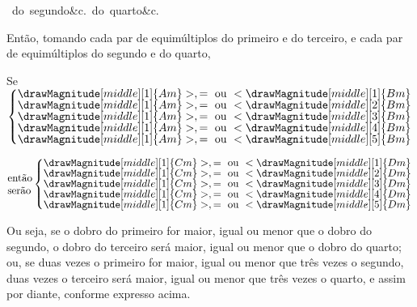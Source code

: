 \documentclass[booklanguage=brazilian]{byrnebook}
\begin{document}
\sepSpace

\vbox{\hfill\hbox{
\vbox{\hbox{do segundo}\hbox{}\hbox{\&c.}}
\vbox{\hbox{do quarto}\hbox{}\hbox{\&c.}}
}\hfill\ }

\sepSpace

Então, tomando cada par de equimúltiplos do primeiro e do terceiro, e cada par de equimúltiplos do segundo e do quarto,

\begin{center}
Se
$\left\{\vcenter{
\nointerlineskip\hbox{$\drawMagnitude[middle][1]{Am} >, = \mbox{ ou } < \drawMagnitude[middle][1]{Bm}$}
\nointerlineskip\hbox{$\drawMagnitude[middle][1]{Am} >, = \mbox{ ou } < \drawMagnitude[middle][2]{Bm}$}
\nointerlineskip\hbox{$\drawMagnitude[middle][1]{Am} >, = \mbox{ ou } < \drawMagnitude[middle][3]{Bm}$}
\nointerlineskip\hbox{$\drawMagnitude[middle][1]{Am} >, = \mbox{ ou } < \drawMagnitude[middle][4]{Bm}$}
\nointerlineskip\hbox{$\drawMagnitude[middle][1]{Am} >, = \mbox{ ou } < \drawMagnitude[middle][5]{Bm}$}
}\right.$

$\vcenter{\hbox{então}\hbox{serão}}\left\{\vcenter{
\nointerlineskip\hbox{$\drawMagnitude[middle][1]{Cm} >, = \mbox{ ou } < \drawMagnitude[middle][1]{Dm}$}
\nointerlineskip\hbox{$\drawMagnitude[middle][1]{Cm} >, = \mbox{ ou } < \drawMagnitude[middle][2]{Dm}$}
\nointerlineskip\hbox{$\drawMagnitude[middle][1]{Cm} >, = \mbox{ ou } < \drawMagnitude[middle][3]{Dm}$}
\nointerlineskip\hbox{$\drawMagnitude[middle][1]{Cm} >, = \mbox{ ou } < \drawMagnitude[middle][4]{Dm}$}
\nointerlineskip\hbox{$\drawMagnitude[middle][1]{Cm} >, = \mbox{ ou } < \drawMagnitude[middle][5]{Dm}$}
}\right.$
\end{center}

Ou seja, se o dobro do primeiro for maior, igual ou menor que o dobro do segundo, o dobro do terceiro será maior, igual ou menor que o dobro do quarto; ou, se duas vezes o primeiro for maior, igual ou menor que três vezes o segundo, duas vezes o terceiro será maior, igual ou menor que três vezes o quarto, e assim por diante, conforme expresso acima.
\end{document}
